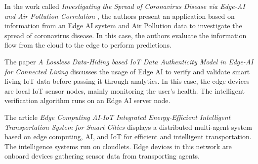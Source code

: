 
In the work called \textit{Investigating the Spread of Coronavirus Disease via Edge-AI and Air Pollution Correlation \cite{gomathy2021investigating}}, the authors present an application based on information from an Edge AI system and Air Pollution data to investigate the spread of coronavirus disease. In this case, the authors evaluate the information flow from the cloud to the edge to perform predictions.



The paper \textit{A Lossless Data-Hiding based IoT Data Authenticity Model in Edge-AI for Connected Living \cite{rahman2021lossless}} discusses the usage of Edge AI to verify and validate smart living IoT data before passing it through analytics. In this case, the edge devices are local IoT sensor nodes, mainly monitoring the user's health. The intelligent verification algorithm runs on an Edge AI server node.



The article \textit{Edge Computing AI-IoT Integrated Energy-Efficient Intelligent Transportation System for Smart Cities \cite{chavhan2022edge}} displays a distributed multi-agent system based on edge computing, AI, and IoT for efficient and intelligent transportation. The intelligence systems run on cloudlets. Edge devices in this network are onboard devices gathering sensor data from transporting agents.


